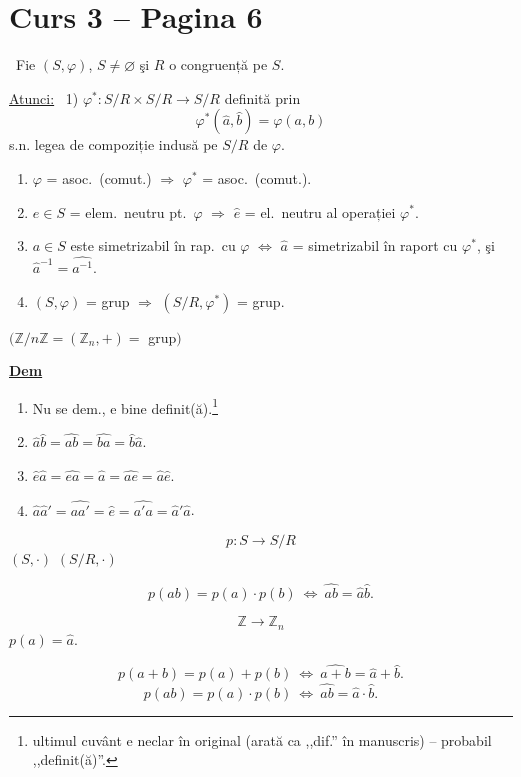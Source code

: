 \documentclass[12pt]{article}
\begin{document}
\section*{Curs 3 -- Pagina 6}

\noindent{} \ Fie $(S,\varphi)$, $S\neq\varnothing$ şi $R$ o congruență pe $S$.

\bigskip
\noindent\underline{Atunci:} \ 1) $\varphi^* : S/R\times S/R \to S/R$ definită prin
\[
\varphi^*(\hat a,\hat b) = \varphi(a,b)
\]
s.n. legea de compoziție indusă pe $S/R$ de $\varphi$.

\begin{enumerate}
\item[(2)] $\varphi$ = asoc.\ (comut.) $\Rightarrow$ $\varphi^*$ = asoc.\ (comut.).
\item[(3)] $e\in S$ = elem.\ neutru pt.\ $\varphi$ $\Rightarrow$ $\hat e$ = el.\ neutru al operației $\varphi^*$.
\item[(4)] $a\in S$ este simetrizabil în rap.\ cu $\varphi$ $\Leftrightarrow$ $\hat a$ = simetrizabil în raport cu $\varphi^*$, şi $\hat a^{-1} = \widehat{a^{-1}}$.
\item[(5)] $(S,\varphi)$ = grup $\Rightarrow$ $(S/R,\varphi^*)$ = grup.
\end{enumerate}

\noindent $\big(\mathbb{Z}/n\mathbb{Z} = (\mathbb{Z}_n,+) = $ grup$\big)$

\bigskip
\noindent\underline{\textbf{Dem}}

\begin{enumerate}
\item[(1)] Nu se dem., e bine definit(ă).\footnote{ultimul cuvânt e neclar în original (arată ca ,,dif.'' în manuscris) -- probabil ,,definit(ă)''.}
\item[(2)] $\hat a\hat b = \widehat{ab} = \widehat{ba} = \hat b\hat a$.
\item[(3)] $\hat e\hat a = \widehat{ea} = \hat a = \widehat{ae} = \hat a\hat e$.
\item[(4)] $\hat a\hat a' = \widehat{aa'} = \hat e = \widehat{a'a} = \hat a'\hat a$.
\end{enumerate}

\[
p : S \to S/R
\]
\noindent $(S,\cdot)$ \hspace{2cm} $(S/R,\cdot)$

\[
p(ab) = p(a)\cdot p(b) \ \Leftrightarrow\ \widehat{ab} = \hat a\hat b.
\]

\[
\mathbb{Z} \to \mathbb{Z}_n
\]
\noindent $p(a) = \hat a$.

\[
p(a+b) = p(a)+p(b) \ \Leftrightarrow\ \widehat{a+b} = \hat a+\hat b.
\]
\[
p(ab) = p(a)\cdot p(b) \ \Leftrightarrow\ \widehat{ab} = \hat a\cdot\hat b.
\]
\end{document}
